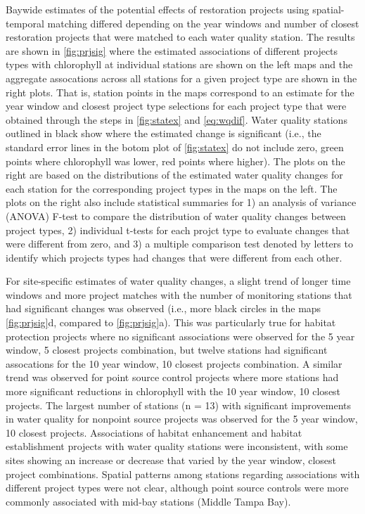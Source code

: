 \documentclass[]{article}
\begin{document}
Baywide estimates of the potential effects of restoration projects using
spatial-temporal matching differed depending on the year windows and
number of closest restoration projects that were matched to each water
quality station. The results are shown in \cref{fig:prjsig} where the
estimated associations of different projects types with chlorophyll at
individual stations are shown on the left maps and the aggregate
assocations across all stations for a given project type are shown in
the right plots. That is, station points in the maps correspond to an
estimate for the year window and closest project type selections for
each project type that were obtained through the steps in
\cref{fig:statex} and \cref{eq:wqdif}. Water quality stations outlined
in black show where the estimated change is significant (i.e., the
standard error lines in the botom plot of \cref{fig:statex} do not
include zero, green points where chlorophyll was lower, red points where
higher). The plots on the right are based on the distributions of the
estimated water quality changes for each station for the corresponding
project types in the maps on the left. The plots on the right also
include statistical summaries for 1) an analysis of variance (ANOVA)
F-test to compare the distribution of water quality changes between
project types, 2) individual t-tests for each projct type to evaluate
changes that were different from zero, and 3) a multiple comparison test
denoted by letters to identify which projects types had changes that
were different from each other.

For site-specific estimates of water quality changes, a slight trend of
longer time windows and more project matches with the number of
monitoring stations that had significant changes was observed (i.e.,
more black circles in the maps \cref{fig:prjsig}d, compared to
\cref{fig:prjsig}a). This was particularly true for habitat protection
projects where no significant associations were observed for the 5 year
window, 5 closest projects combination, but twelve stations had
significant assocations for the 10 year window, 10 closest projects
combination. A similar trend was observed for point source control
projects where more stations had more significant reductions in
chlorophyll with the 10 year window, 10 closest projects. The largest
number of stations (n = 13) with significant improvements in water
quality for nonpoint source projects was observed for the 5 year window,
10 closest projects. Associations of habitat enhancement and habitat
establishment projects with water quality stations were inconsistent,
with some sites showing an increase or decrease that varied by the year
window, closest project combinations. Spatial patterns among stations
regarding associations with different project types were not clear,
although point source controls were more commonly associated with
mid-bay stations (Middle Tampa Bay).
\end{document}
